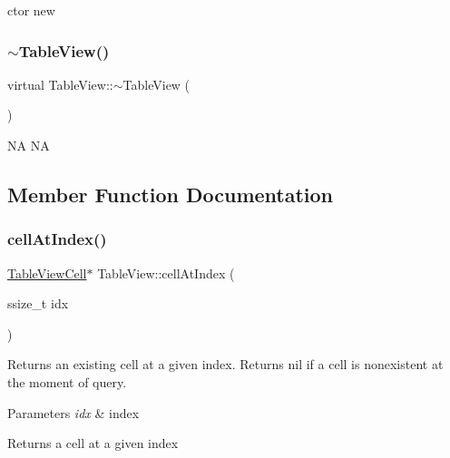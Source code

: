 ctor  new \mbox{\label{classTableView_a37d3730d6416dc370e9882c971016061}} 
\subsubsection{\texorpdfstring{$\sim$\+Table\+View()}{~TableView()}\hspace{0.1cm}{\footnotesize\ttfamily [2/2]}}
{\footnotesize\ttfamily virtual Table\+View\+::$\sim$\+Table\+View (\begin{DoxyParamCaption}{ }\end{DoxyParamCaption})\hspace{0.3cm}{\ttfamily [virtual]}}

NA  NA 

\subsection{Member Function Documentation}
\mbox{\label{classTableView_a90574ea8dfa630cd2b4354ae134b8731}} 
\subsubsection{\texorpdfstring{cell\+At\+Index()}{cellAtIndex()}\hspace{0.1cm}{\footnotesize\ttfamily [1/2]}}
{\footnotesize\ttfamily \hyperlink{classTableViewCell}{Table\+View\+Cell}$\ast$ Table\+View\+::cell\+At\+Index (\begin{DoxyParamCaption}\item[{ssize\+\_\+t}]{idx }\end{DoxyParamCaption})}

Returns an existing cell at a given index. Returns nil if a cell is nonexistent at the moment of query.


\begin{DoxyParams}{Parameters}
{\em idx} & index \\
\hline
\end{DoxyParams}
\begin{DoxyReturn}{Returns}
a cell at a given index 
\end{DoxyReturn}
\mbox{\label{classTableView_a629f0d9b1261ba105583e03ec3cf69bc}} 
